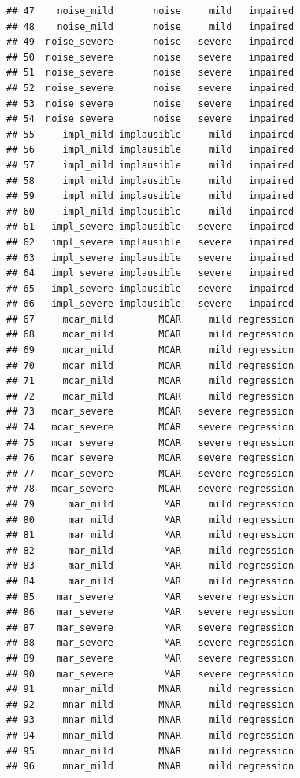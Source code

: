 \documentclass[
]{article}
\begin{document}
\begin{verbatim}
## 47    noise_mild       noise     mild   impaired
## 48    noise_mild       noise     mild   impaired
## 49  noise_severe       noise   severe   impaired
## 50  noise_severe       noise   severe   impaired
## 51  noise_severe       noise   severe   impaired
## 52  noise_severe       noise   severe   impaired
## 53  noise_severe       noise   severe   impaired
## 54  noise_severe       noise   severe   impaired
## 55     impl_mild implausible     mild   impaired
## 56     impl_mild implausible     mild   impaired
## 57     impl_mild implausible     mild   impaired
## 58     impl_mild implausible     mild   impaired
## 59     impl_mild implausible     mild   impaired
## 60     impl_mild implausible     mild   impaired
## 61   impl_severe implausible   severe   impaired
## 62   impl_severe implausible   severe   impaired
## 63   impl_severe implausible   severe   impaired
## 64   impl_severe implausible   severe   impaired
## 65   impl_severe implausible   severe   impaired
## 66   impl_severe implausible   severe   impaired
## 67     mcar_mild        MCAR     mild regression
## 68     mcar_mild        MCAR     mild regression
## 69     mcar_mild        MCAR     mild regression
## 70     mcar_mild        MCAR     mild regression
## 71     mcar_mild        MCAR     mild regression
## 72     mcar_mild        MCAR     mild regression
## 73   mcar_severe        MCAR   severe regression
## 74   mcar_severe        MCAR   severe regression
## 75   mcar_severe        MCAR   severe regression
## 76   mcar_severe        MCAR   severe regression
## 77   mcar_severe        MCAR   severe regression
## 78   mcar_severe        MCAR   severe regression
## 79      mar_mild         MAR     mild regression
## 80      mar_mild         MAR     mild regression
## 81      mar_mild         MAR     mild regression
## 82      mar_mild         MAR     mild regression
## 83      mar_mild         MAR     mild regression
## 84      mar_mild         MAR     mild regression
## 85    mar_severe         MAR   severe regression
## 86    mar_severe         MAR   severe regression
## 87    mar_severe         MAR   severe regression
## 88    mar_severe         MAR   severe regression
## 89    mar_severe         MAR   severe regression
## 90    mar_severe         MAR   severe regression
## 91     mnar_mild        MNAR     mild regression
## 92     mnar_mild        MNAR     mild regression
## 93     mnar_mild        MNAR     mild regression
## 94     mnar_mild        MNAR     mild regression
## 95     mnar_mild        MNAR     mild regression
## 96     mnar_mild        MNAR     mild regression

\end{verbatim}
\end{document}
